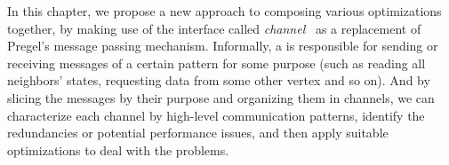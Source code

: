 \documentclass{sokendai_thesis} %
\begin{document}

In this chapter, we propose a new approach to composing various optimizations together, by making use of the interface called {\em channel}~\cite{husky} as a replacement of Pregel's message passing mechanism.
Informally, a  is responsible for sending or receiving messages of a certain pattern for some purpose (such as reading all neighbors' states, requesting data from some other vertex and so on).
And by slicing the messages by their purpose and organizing them in channels, we can characterize each channel by high-level communication patterns, identify the redundancies or potential performance issues, and then apply suitable optimizations to deal with the problems.
\end{document}

